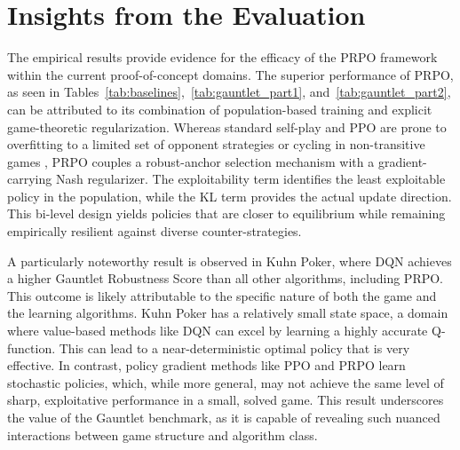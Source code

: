 \documentclass[sigconf,anonymous]{aamas}
\begin{document}
\begin{table}[h!]
\centering
\small
\caption{Cross-Ecosystem Validation -- Matching Pennies. Train: Population A (simple bots) $\rightarrow$ Evaluate: Population B (adaptive, unseen).}
\label{tab:cross_mp}
\end{table}
\fi

\section{Insights from the Evaluation}

The empirical results provide evidence for the efficacy of the PRPO framework within the current proof-of-concept domains. The superior performance of PRPO, as seen in Tables~\ref{tab:baselines},~\ref{tab:gauntlet_part1}, and~\ref{tab:gauntlet_part2}, can be attributed to its combination of population-based training and explicit game-theoretic regularization. Whereas standard self-play and PPO are prone to overfitting to a limited set of opponent strategies or cycling in non-transitive games \cite{Balduzzi2019}, PRPO couples a robust-anchor selection mechanism with a gradient-carrying Nash regularizer. The exploitability term identifies the least exploitable policy in the population, while the KL term provides the actual update direction. This bi-level design yields policies that are closer to equilibrium while remaining empirically resilient against diverse counter-strategies.

A particularly noteworthy result is observed in Kuhn Poker, where DQN achieves a higher Gauntlet Robustness Score than all other algorithms, including PRPO. This outcome is likely attributable to the specific nature of both the game and the learning algorithms. Kuhn Poker has a relatively small state space, a domain where value-based methods like DQN can excel by learning a highly accurate Q-function. This can lead to a near-deterministic optimal policy that is very effective. In contrast, policy gradient methods like PPO and PRPO learn stochastic policies, which, while more general, may not achieve the same level of sharp, exploitative performance in a small, solved game. This result underscores the value of the Gauntlet benchmark, as it is capable of revealing such nuanced interactions between game structure and algorithm class.
\end{document}
